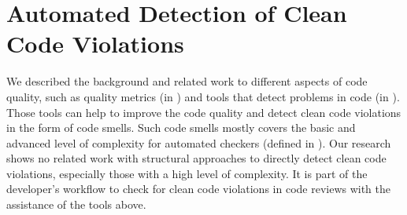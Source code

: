 \section{Automated Detection of Clean Code Violations}
We described the background and related work to different aspects of code quality, such as quality metrics (in ) and tools that detect problems in code (in ). Those tools can help to improve the code quality and detect clean code violations in the form of code smells. Such code smells mostly covers the basic and advanced level of complexity for automated checkers (defined in ). Our research shows no related work with structural approaches to directly detect clean code violations, especially those with a high level of complexity. It is part of the developer's workflow to check for clean code violations in code reviews with the assistance of the tools above.  

